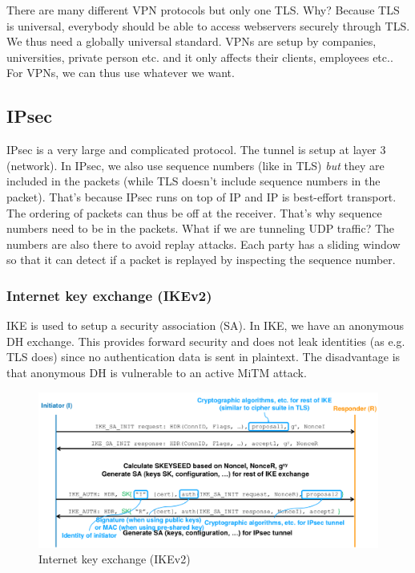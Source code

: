 \documentclass[11pt,oneside,a4paper]{article}
\begin{document}
\noindent There are many different VPN protocols but only one TLS. Why?
Because TLS is universal, everybody should be able to access webservers securely through TLS.  We thus need a globally universal standard. VPNs are setup by companies, universities, private person etc. and it only affects their clients, employees etc.. For VPNs, we can thus use whatever we want.

\subsection{IPsec}

IPsec is a very large and complicated protocol. The tunnel is setup at layer 3 (network). In IPsec, we also use sequence numbers (like in TLS) \textit{but} they are included in the packets (while TLS doesn't include sequence numbers in the packet). That's because IPsec runs on top of IP and IP is best-effort transport. The ordering of packets can thus be off at the receiver. That's why sequence numbers need to be in the packets. What if we are tunneling UDP traffic?
The numbers are also there to avoid replay attacks. Each party has a sliding window so that it can
detect if a packet is replayed by inspecting the sequence number.

\subsubsection{Internet key exchange (IKEv2)}

IKE is used to setup a security association (SA). In IKE, we have an anonymous DH exchange. This provides forward security and does not leak identities (as e.g. TLS does) since no authentication data is sent in plaintext. The disadvantage is that anonymous DH is vulnerable to an active MiTM attack.

\begin{figure}[t!]
	\centering
	\includegraphics[width=0.9\linewidth]{figures/ikev2}
	\caption{Internet key exchange (IKEv2)}
	\label{fig:ikev2}
\end{figure}
\end{document}
